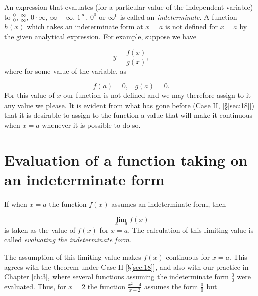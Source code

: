 An expression that evaluates 
(for a particular value of the independent variable)
to $\frac{0}{0}$, $\frac{\infty}{\infty}$,
$0 \cdot \infty$, $\infty - \infty$, $1^\infty$, $0^0$ or $\infty^0$
is called an \textit{indeterminate}.
A function $h(x)$ which takes an indeterminate form at $x=a$ 
is not defined for $x=a$ by the given analytical expression.
For example, suppose we have

\[
y = \frac{f(x)}{g(x)},
\]
where for some value of the variable, as %

\[
f(a) = 0,\ \ \ \ g(a) = 0.
\]
For this value of $x$ our function is not defined and we may therefore 
assign to it any value we please. It is evident from what has gone before 
(Case II, [\S \ref{sec:18}]) that it is desirable to assign to the function a 
value that will make it continuous when $x = a$ whenever it is possible to do so.


\section{Evaluation of a function taking on an indeterminate form}
\label{sec:110}

If when $x = a$ the function $f(x)$ assumes an indeterminate form, then

\[
\lim_{x = a} f(x)
\]
is taken as the value of $f(x)$ for $x = a$.
The calculation of this limiting value is called {\it evaluating the indeterminate form}.

The assumption of this limiting value makes $f(x)$ continuous for $x = a$. 
This agrees with the theorem under Case II [\S \ref{sec:18}], and also with our 
practice in Chapter \ref{ch:3}, where several functions assuming 
the indeterminate form 
$
\frac{0}{0}
$
were evaluated. Thus, for $x = 2$ the function 
$
\frac{x^2 - 4}{x - 2}
$ 
assumes the form 
$
\frac{0}{0}
$
but

